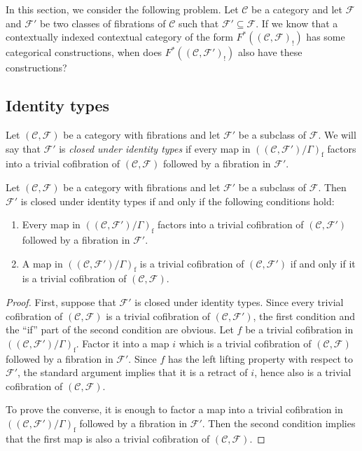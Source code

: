 \documentclass[reqno]{amsart}
\theoremstyle{definition}
\theoremstyle{remark}
\newcommand{\fs}[1]{\mathrm{#1}}
\newcommand{\scat}[1]{\mathcal{#1}}
\newcommand{\Fib}{\mathcal{F}}
\numberwithin{figure}{section}
\begin{document}
In this section, we consider the following problem.
Let $\scat{C}$ be a category and let $\Fib$ and $\Fib'$ be two classes of fibrations of $\scat{C}$ such that $\Fib' \subseteq \Fib$.
If we know that a contextually indexed contextual category of the form $F^*((\scat{C},\Fib)_!)$ has some categorical constructions, when does $F^*((\scat{C},\Fib')_!)$ also have these constructions?

\subsection{Identity types}

Let $(\scat{C},\Fib)$ be a category with fibrations and let $\Fib'$ be a subclass of $\Fib$.
We will say that $\Fib'$ is \emph{closed under identity types} if every map in $((\scat{C},\Fib')/\Gamma)_\fs{f}$ factors into a trivial cofibration of $(\scat{C},\Fib)$ followed by a fibration in $\Fib'$.

\begin{lem}[subfib]
Let $(\scat{C},\Fib)$ be a category with fibrations and let $\Fib'$ be a subclass of $\Fib$.
Then $\Fib'$ is closed under identity types if and only if the following conditions hold:
\begin{enumerate}
\item \label{it:subfib-factor} Every map in $((\scat{C},\Fib')/\Gamma)_\fs{f}$ factors into a trivial cofibration of $(\scat{C},\Fib')$ followed by a fibration in $\Fib'$.
\item \label{it:subfib-we} A map in $((\scat{C},\Fib')/\Gamma)_\fs{f}$ is a trivial cofibration of $(\scat{C},\Fib')$ if and only if it is a trivial cofibration of $(\scat{C},\Fib)$.
\end{enumerate}
\end{lem}
\begin{proof}
First, suppose that $\Fib'$ is closed under identity types.
Since every trivial cofibration of $(\scat{C},\Fib)$ is a trivial cofibration of $(\scat{C},\Fib')$, the first condition and the ``if'' part of the second condition are obvious.
Let $f$ be a trivial cofibration in $((\scat{C},\Fib')/\Gamma)_\fs{f}$.
Factor it into a map $i$ which is a trivial cofibration of $(\scat{C},\Fib)$ followed by a fibration in $\Fib'$.
Since $f$ has the left lifting property with respect to $\Fib'$, the standard argument implies that it is a retract of $i$, hence also is a trivial cofibration of $(\scat{C},\Fib)$.

To prove the converse, it is enough to factor a map into a trivial cofibration in $((\scat{C},\Fib')/\Gamma)_\fs{f}$ followed by a fibration in $\Fib'$.
Then the second condition implies that the first map is also a trivial cofibration of $(\scat{C},\Fib)$.
\end{proof}
\end{document}
